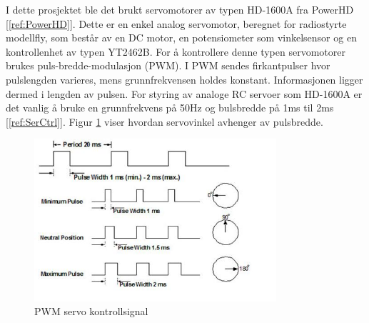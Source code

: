 I dette prosjektet ble det brukt servomotorer av typen HD-1600A fra PowerHD [\ref{ref:PowerHD}]. Dette er en enkel analog servomotor, beregnet for radiostyrte modellfly, som består av en DC motor, en potensiometer som vinkelsensor og en kontrollenhet av typen YT2462B. For å kontrollere denne typen servomotorer brukes puls-bredde-modulasjon (PWM). I PWM sendes firkantpulser hvor pulslengden varieres, mens grunnfrekvensen holdes konstant. Informasjonen ligger dermed i lengden av pulsen. For styring av analoge RC servoer som HD-1600A er det vanlig å bruke en grunnfrekvens på 50Hz og bulsbredde på 1ms til 2ms [\ref{ref:SerCtrl}]. Figur \ref{fig:PWM} viser hvordan servovinkel avhenger av pulsbredde.

\begin{figure}[H]
\centering
\includegraphics[width=0.8\textwidth]{img/pwm_servo.jpg}
\caption{PWM servo kontrollsignal}
\label{fig:PWM}
\end{figure}   
